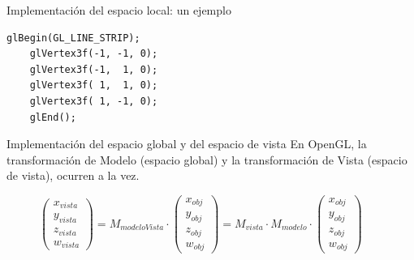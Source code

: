 \documentclass{beamer}
\begin{document}
\begin{frame}[fragile]{Implementación del espacio local: un ejemplo}
  \begin{lstlisting}[frame=single, linewidth=0.52\textwidth, gobble=4, xleftmargin=90pt, xrightmargin=-90pt]
    glBegin(GL_LINE_STRIP);
    glVertex3f(-1, -1, 0);
    glVertex3f(-1,  1, 0);
    glVertex3f( 1,  1, 0);
    glVertex3f( 1, -1, 0);
    glEnd();
  \end{lstlisting}

    \begin{figure} [h!]
    \centering
  \end{figure}

\end{frame}

\begin{frame}{Implementación del espacio global y del espacio de vista}
  En OpenGL, la transformación de Modelo (espacio global) y la transformación de Vista (espacio de vista), ocurren a la vez.
  \begin{figure}[ht]
  \centering
  \(
  \begin{pmatrix}
    x_{vista}\\y_{vista}\\z_{vista}\\w_{vista}
  \end{pmatrix}
  = M_{modeloVista} \cdot
  \begin{pmatrix}
    x_{obj}\\y_{obj}\\z_{obj}\\w_{obj}
  \end{pmatrix}
  = M_{vista} \cdot M_{modelo} \cdot
  \begin{pmatrix}
    x_{obj}\\y_{obj}\\z_{obj}\\w_{obj}
  \end{pmatrix}
  \)
\end{figure}
\end{frame}
\end{document}
